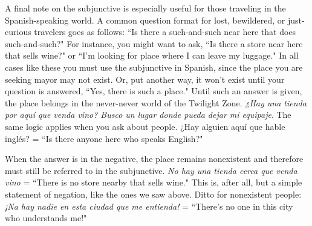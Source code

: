 A final note on the subjunctive is especially useful for those
traveling in the Spanish-speaking world. A common question format
for lost, bewildered, or just-curious travelers goes as follows: ``Is there
a such-and-such near here that does such-and-such?" For instance, you
might want to ask, ``Is there a store near here that sells wine?" or ``I'm
looking for place where I can leave my luggage." In all cases like these
you must use the subjunctive in Spanish, since the place you are seeking mayor may not exist. Or, put another way, it won't exist until your
question is answered, ``Yes, there is such a place." Until such an answer is given, the place belongs in the never-never world of the Twilight Zone.
\emph{¿Hay una tienda por aquí que venda vino? Busco un lugar
donde pueda dejar mi equipaje}. The same logic applies when you ask
about people. ¿Hay alguien aquí que hable inglés? = ``Is there anyone
here who speaks English?"

When the answer is in the negative, the place remains nonexistent and therefore must still be referred to in the subjunctive. \emph{No hay
una tienda cerca que venda vino} = ``There is no store nearby that
sells wine." This is, after all, but a simple statement of negation, like
the ones we saw above. Ditto for nonexistent people: \emph{¡Na hay nadie en
esta ciudad que me entienda!} = ``There's no one in this city who understands me!"

